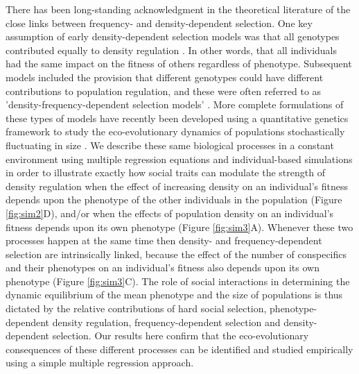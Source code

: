 \documentclass{article}
\begin{document}
There has been long-standing acknowledgment in the theoretical literature of the close links between frequency- and density-dependent selection. One key assumption of early density-dependent selection models was that all genotypes contributed equally to density regulation \citep{Joshi2001}. In other words, that all individuals had the same impact on the fitness of others regardless of phenotype. Subsequent models included the provision that different genotypes could have different contributions to population regulation, and these were often referred to as 'density-frequency-dependent selection models' \citep{Anderson1971, Matessi1976, Asmussen1983}. More complete formulations of these types of models have recently been developed using a quantitative genetics framework to study the eco-evolutionary dynamics of populations stochastically fluctuating in size \citep{Lande2007, Engen2020}. We describe these same biological processes in a constant environment using multiple regression equations and individual-based simulations in order to illustrate exactly how social traits can modulate the strength of density regulation when the effect of increasing density on an individual's fitness depends upon the phenotype of the other individuals in the population (Figure \ref{fig:sim2}D), and/or when the effects of population density on an individual's fitness depends upon its own phenotype (Figure \ref{fig:sim3}A). Whenever these two processes happen at the same time then density- and frequency-dependent selection are intrinsically linked, because the effect of the number of conspecifics and their phenotypes on an individual's fitness also depends upon its own phenotype (Figure \ref{fig:sim3}C). The role of social interactions in determining the dynamic equilibrium of the mean phenotype and the size of populations is thus dictated by the relative contributions of hard social selection, phenotype-dependent density regulation, frequency-dependent selection and density-dependent selection. Our results here confirm that the eco-evolutionary consequences of these different processes can be identified and studied empirically using a simple multiple regression approach. 
\end{document}
